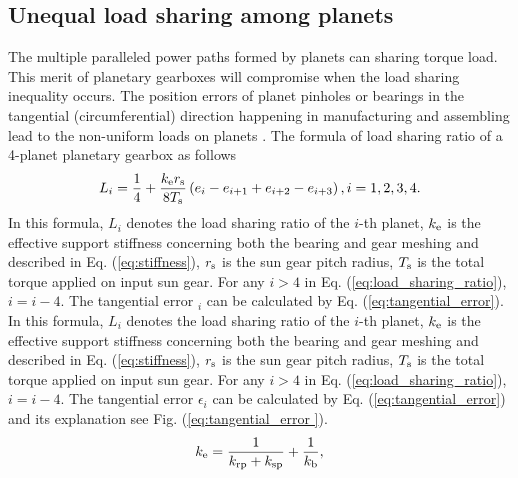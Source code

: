 \documentclass[a4paper]{cas-sc}%
\begin{document}
\subsection{Unequal load sharing among planets}
\par The multiple paralleled power paths formed by planets can sharing torque load. This merit of planetary gearboxes will compromise when the load sharing inequality occurs. The position errors of planet pinholes or bearings in the tangential (circumferential) direction happening in manufacturing and assembling lead to the non-uniform loads on planets \cite{Singh2010511-530}. The formula of load sharing ratio of a 4-planet planetary gearbox as follows \cite{Ligata2009}
\begin{equation}
    L_i=\frac{1}{4}+\frac{k_{\rm e} r_{\rm s}}{8 T_{\rm s}}\left(e_i-e_{i+1}+e_{i+2}-e_{i+3}\right), i=1,2,3,4. \label{eq:load_sharing_ratio}
\end{equation}
In this formula, \(L_i\) denotes the load sharing ratio of the \(i\)-th planet, \(k_{\rm e}\) is the effective support stiffness concerning both the bearing and gear meshing and described in Eq. (\ref{eq:stiffness}), \(r_{\rm s}\) is the sun gear pitch radius, \(T_{\rm s}\) is the total torque applied on input sun gear. For any \(i>4\) in Eq. (\ref{eq:load_sharing_ratio}), \(i=i-4\). The tangential error $_{i}$ can be calculated by Eq. (\ref{eq:tangential_error}).
In this formula, \(L_i\) denotes the load sharing ratio of the \(i\)-th planet, \(k_{\rm e}\) is the effective support stiffness concerning both the bearing and gear meshing and described in Eq. (\ref{eq:stiffness}), \(r_{\rm s}\) is the sun gear pitch radius, \(T_{\rm s}\) is the total torque applied on input sun gear. For any \(i>4\) in Eq. (\ref{eq:load_sharing_ratio}), \(i=i-4\). The tangential error $\epsilon_{i}$ can be calculated by Eq. (\ref{eq:tangential_error}) and its explanation see Fig. (\ref{eq:tangential_error }).
\begin{equation}
    k_{\rm e}=\frac{1}{k_{\rm rp}+k_{\rm sp}}+\frac{1}{k_{\rm b}},\label{eq:stiffness}
\end{equation}
\end{document}
